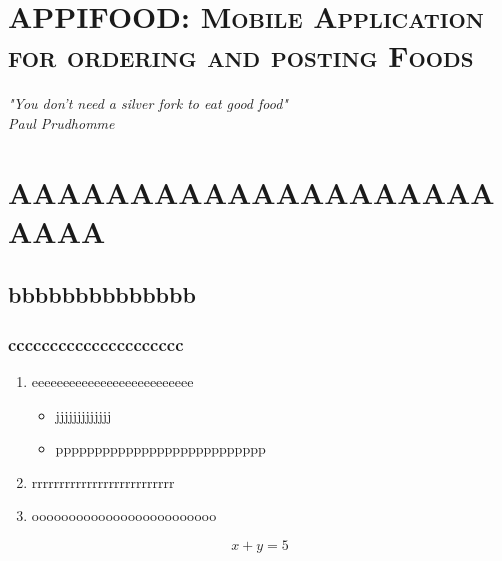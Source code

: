 \newpage
 \section{\textsc{APPIFOOD: Mobile Application for ordering and posting Foods }}
 \begin{center}
 	\textbf{}
 \end{center}
\label{chap:01}
 \lhead{}
 \cfoot{ \thepage}
  \pagestyle{fancy}
\renewcommand{\headrulewidth}{0.4pt}



\begin{flushright}
\textit{"You don’t need a silver fork to eat good food"\\
Paul Prudhomme}\\

\end{flushright}

\section{ AAAAAAAAAAAAAAAAAAAAAAAA}
\subsection{bbbbbbbbbbbbbb}
\subsubsection{ccccccccccccccccccccc}

\begin{enumerate}
    \item eeeeeeeeeeeeeeeeeeeeeeeeee
    \begin{itemize}
    \item jjjjjjjjjjjjj
    \item ppppppppppppppppppppppppppp
\end{itemize}
    \item rrrrrrrrrrrrrrrrrrrrrrrrrr
    \item ooooooooooooooooooooooooo \cite{telli}
\end{enumerate}

$$ x+y=5  $$

